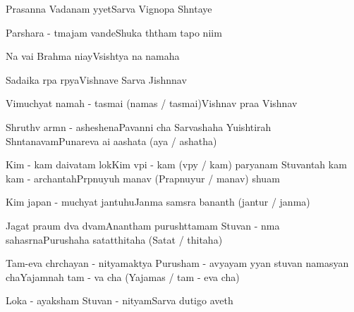 \documentclass[20pt]{article}
\begin{document}

{Prasanna Vadanam {\Dh}y{\A}yet}{Sarva Vignopa Sh{\A}ntaye}
\phantom{\countr}


{Par{\A}shara - {\A}tmajam vande}{Shuka th{\A}tham tapo ni{\dhh}im}

{Na{\mo} vai Brahma ni{\dhh}ay{\e}}{V{\aaa}sisht{\A}ya na{\mo} namaha}

\newpage 

{Sadaika r{\oo}pa r{\oo}p{\A}ya}{Vishnave Sarva Jishnnav{\e}}

{Vimuchyat{\e} namah - tasmai (namas / tasmai)}{Vishnav{\e} pra{\bh}a Vishnav{\e}}


{Shruthv{\A} {\Dh}arm{\A}n - asheshena}{Pavan{\A}ni cha Sarvashaha}
{Yu{\dhh}ishtirah Sh{\A}ntanavam}{Punareva \dash a{\bh}i \dash a{\bh}ashata (a{\bh}ya / {\bh}ashatha)}

\newpage

{Kim - {\e}kam daivatam lok{\e}}{Kim v{\A}pi - {\e}kam (v{\A}py{\e} / kam) par{\A}yanam}
{Stuvantah kam kam - archantah}{Pr{\A}pnuyuh \dash manav{\ah} (Prapnuyur / manav{\ah}) shu{\bh}am}

{Kim japan - muchyat{\e} jantuhu}{Janma sams{\A}ra ban{\dhh}an{\A}th (jantur / janma)}

{Jagat pra{\bh}um d{\e}va d{\e}vam}{Anantham purush{\oh}ttamam} 
{Stuvan - n{\A}ma sahasr{\e}na}{Purushaha satat{\oh}thitaha (Satat{\oh} / thitaha)}

\newpage

\slokash
{Tam-eva ch{\aaa}rchayan - nityam}{{\Bh}aktya Purusham - avyayam}
{{\Dh}y{\A}yan stuvan namasyan \dash cha}{Yajam{\aaa}nah tam - {\e}va cha (Yajam{\an}as / tam - eva cha)}

{Loka - a{\dhh}yaksham Stuvan - nityam}{Sarva dutigo {\bh}aveth}
\end{document}
